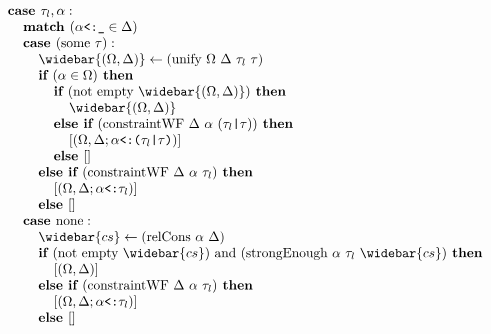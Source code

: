 \documentclass[acmsmall]{acmart}
\begin{document}
\begin{figure*}[h]
\[\begin{array}[t]{@{} l}
\end{array}
\begin{array}[t]{@{} l}
    \I \B{case } \tau_l, \alpha : 
    \\
    \I\I \B{match } (\code{$\alpha$<:\_} \in \Delta)
    \\
    \I\I \B{case } (\F{some } \tau) :
    \\
    \I\I\I \widebar{(\Omega, \Delta)} \leftarrow (\F{unify } \Omega\ \Delta\ \tau_l\ \tau)
    \\
    \I\I\I \B{if } (\alpha \in \Omega) \B{ then }
    \\
    \I\I\I\I \B{if } (\F{not } \F{empty } \widebar{(\Omega, \Delta)}) \B{ then }
    \\
    \I\I\I\I\I \widebar{(\Omega, \Delta)}
    \\
    \I\I\I\I \B{else if } (\F{constraintWF } \Delta\ \alpha\ (\code{$\tau_l$|$\tau$})) \B{ then }
    \\
    \I\I\I\I\I [(\Omega, \Delta;\code{$\alpha$<:($\tau_l$|$\tau$)})] 
    \\
    \I\I\I\I \B{else } [] 
    \\
    \I\I\I \B{else if } (\F{constraintWF } \Delta\ \alpha\ \tau_l) \B{ then }
    \\
    \I\I\I\I [(\Omega, \Delta;\code{$\alpha$<:$\tau_l$})] 
    \\
    \I\I\I \B{else } [] 
    \\
    \I\I \B{case } \F{none} :
    \\
    \I\I\I \widebar{cs} \leftarrow (\F{relCons } \alpha\ \Delta)  
    \\
    \I\I\I \B{if } (\F{not } \F{empty } \widebar{cs}) \F{ and } 
    (\F{strongEnough } \alpha\ \tau_l\ \widebar{cs}) \B{ then }
    \\
    \I\I\I\I [(\Omega, \Delta)]
    \\
    \I\I\I \B{else if } (\F{constraintWF } \Delta\ \alpha\ \tau_l) \B{ then }
    \\
    \I\I\I\I [(\Omega, \Delta;\code{$\alpha$<:$\tau_l$})] 
    \\
    \I\I\I \B{else } []

    \\


\end{array}\]
\end{figure*}
\end{document}
